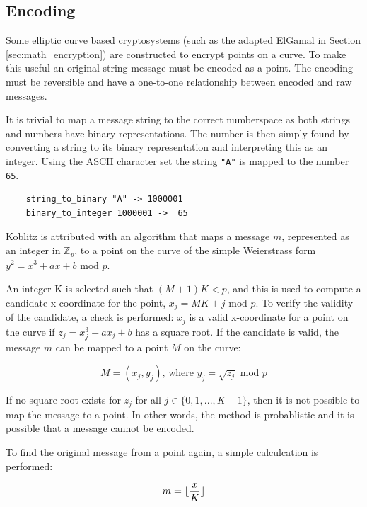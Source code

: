 \subsection{Encoding}
\label{sec:math_encoding}

Some elliptic curve based cryptosystems (such as the adapted ElGamal in Section \ref{sec:math_encryption}) are constructed to encrypt points on a curve. To make
this useful an original string message must be encoded as a point. The encoding must be reversible and have a one-to-one relationship between encoded and raw
messages.

It is trivial to map a message string to the correct numberspace as both strings and numbers have binary representations. The number is then
simply found by converting a string to its binary representation and interpreting this as an integer. Using the ASCII character set the string
\verb+"A"+ is mapped to the number \verb+65+.

\begin{verbatim}
    string_to_binary "A" -> 1000001
    binary_to_integer 1000001 ->  65
\end{verbatim}

Koblitz is attributed with an algorithm that maps a message \(m\), represented as an integer in \(\mathbb{Z}_p\), to a point on the curve of the
simple Weierstrass form \(y^2 = x^3 + ax + b \text{ mod } p\).\cite{MappingAMessage}

An integer K is selected such that \((M + 1)K < p\), and this is used to compute
a candidate x-coordinate for the point, \(x_j = MK + j \text{ mod } p\). To verify the validity of the candidate, a check is performed: \(x_j\)
is a valid x-coordinate for a point on the curve if \(z_j = x_j^3 + ax_j + b\) has a square root. If the candidate is valid, the message \(m\)
can be mapped to a point \(M\) on the curve:

\begin{equation}
	M = (x_j, y_j) \text{, where } y_j = \sqrt{z_j} \text{ mod } p
\end{equation}

If no square root exists for \(z_j\) for all \(j \in \{0,1,...,K-1\}\), then it is not possible to map the message to a point. In other
words, the method is probablistic and it is possible that a message cannot be encoded.

To find the original message from a point again, a simple calculcation is performed:

\begin{equation}
	m = {\lfloor {x \over K} \rfloor}
\end{equation}

